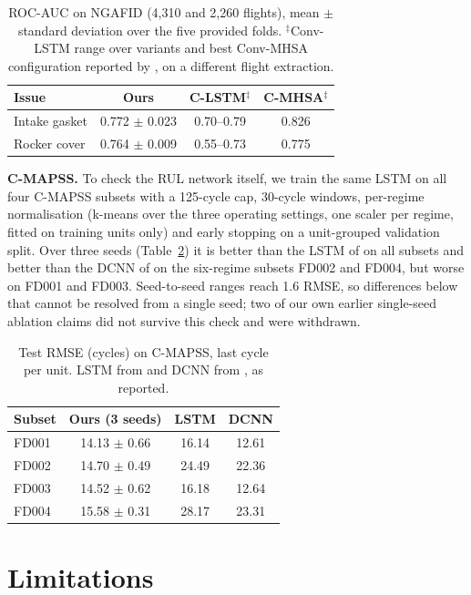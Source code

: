 \begin{table}[t]
\centering
\small
\begin{tabular}{@{}lccc@{}}
\toprule
Issue & Ours & C-LSTM$^\ddagger$ & C-MHSA$^\ddagger$ \\
\midrule
Intake gasket & 0.772 $\pm$ 0.023 & 0.70--0.79 & 0.826 \\
Rocker cover & 0.764 $\pm$ 0.009 & 0.55--0.73 & 0.775 \\
\bottomrule
\end{tabular}
\caption{ROC-AUC on NGAFID (4,310 and 2,260 flights), mean $\pm$ standard deviation over the five provided folds. $^\ddagger$Conv-LSTM range over variants and best Conv-MHSA configuration reported by \citet{yang2022ngafid}, on a different flight extraction.}
\label{tab:ngafid}
\end{table}

\noindent\textbf{C-MAPSS.} To check the RUL network itself, we train the same LSTM on all four C-MAPSS subsets with a 125-cycle cap, 30-cycle windows, per-regime normalisation (k-means over the three operating settings, one scaler per regime, fitted on training units only) and early stopping on a unit-grouped validation split. Over three seeds (Table~\ref{tab:cmapss}) it is better than the LSTM of \citet{zheng2017lstm} on all subsets and better than the DCNN of \citet{li2018dcnn} on the six-regime subsets FD002 and FD004, but worse on FD001 and FD003. Seed-to-seed ranges reach 1.6 RMSE, so differences below that cannot be resolved from a single seed; two of our own earlier single-seed ablation claims did not survive this check and were withdrawn.

\begin{table}[t]
\centering
\small
\begin{tabular}{@{}lccc@{}}
\toprule
Subset & Ours (3 seeds) & LSTM & DCNN \\
\midrule
FD001 & 14.13 $\pm$ 0.66 & 16.14 & 12.61 \\
FD002 & 14.70 $\pm$ 0.49 & 24.49 & 22.36 \\
FD003 & 14.52 $\pm$ 0.62 & 16.18 & 12.64 \\
FD004 & 15.58 $\pm$ 0.31 & 28.17 & 23.31 \\
\bottomrule
\end{tabular}
\caption{Test RMSE (cycles) on C-MAPSS, last cycle per unit. LSTM from \citet{zheng2017lstm} and DCNN from \citet{li2018dcnn}, as reported.}
\label{tab:cmapss}
\end{table}

\section{Limitations}
\label{sec:lim}

